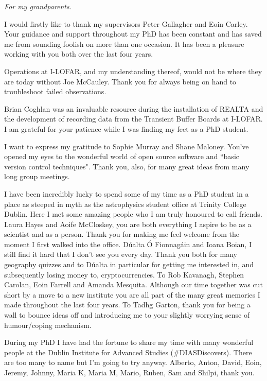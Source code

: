 
\begin{dedication}
\textit{For my grandparents.}
\end{dedication}

\begin{acknowledgements}
I would firstly like to thank my supervisors Peter Gallagher and Eoin Carley. Your guidance and support throughout my PhD has been constant and has saved me from sounding foolish on more than one occasion. It has been a pleasure working with you both over the last four years.

Operations at I-LOFAR, and my understanding thereof, would not be where they are today without Joe McCauley. Thank you for always being on hand to troubleshoot failed observations.

Brian Coghlan was an invaluable resource during the installation of REALTA and the development of recording data from the Transient Buffer Boards at I-LOFAR. I am grateful for your patience while I was finding my feet as a PhD student. 

I want to express my gratitude to Sophie Murray and Shane Maloney. You've opened my eyes to the wonderful world of open source software and ``basic version control techniques". Thank you, also, for many great ideas from many long group meetings.

I have been incredibly lucky to spend some of my time as a PhD student in a place as steeped in myth as the astrophysics student office at Trinity College Dublin. Here I met some amazing people who I am truly honoured to call friends. Laura Hayes and Aoife McCloskey, you are both everything I aspire to be as a scientist and as a person. Thank you for making me feel welcome from the moment I first walked into the office.
D\'ualta \'O Fionnag\'ain and Ioana Boian, I still find it hard that I don't see you every day. Thank you both for many geography quizzes and to D\'ualta in particular for getting me interested in, and subsequently losing money to, cryptocurrencies.
To Rob Kavanagh, Stephen Carolan, Eoin Farrell and Amanda Mesquita. Although our time together was cut short by a move to a new institute you are all part of the many great memories I made throughout the last four years.
To Tadhg Garton, thank you for being a wall to bounce ideas off and introducing me to your slightly worrying sense of humour/coping mechanism.

During my PhD I have had the fortune to share my time with many wonderful people at the Dublin Institute for Advanced Studies (\#DIASDiscovers). There are too many to name but I'm going to try anyway. Alberto, Anton, David, Eoin, Jeremy, Johnny, Maria K, Maria M, Mario, Ruben, Sam and Shilpi, thank you.


\end{acknowledgements}
